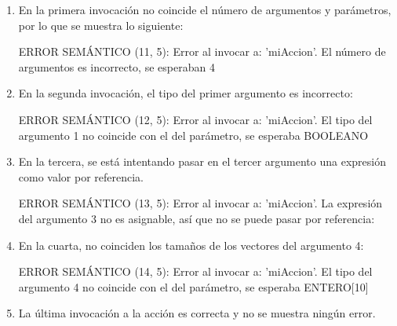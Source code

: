 \begin{enumerate}
    \item En la primera invocación no coincide el número de argumentos y parámetros, por lo que se muestra lo siguiente:

        \begin{codigo}
ERROR SEMÁNTICO (11, 5): Error al invocar a: 'miAccion'. El número de argumentos es incorrecto, se esperaban 4
        \end{codigo}

    \item En la segunda invocación, el tipo del primer argumento es incorrecto:

        \begin{codigo}
ERROR SEMÁNTICO (12, 5): Error al invocar a: 'miAccion'. El tipo del argumento 1 no coincide con el del parámetro, se esperaba BOOLEANO
        \end{codigo}

    \item En la tercera, se está intentando pasar en el tercer argumento una expresión como valor por referencia.

        \begin{codigo}
ERROR SEMÁNTICO (13, 5): Error al invocar a: 'miAccion'. La expresión del argumento 3 no es asignable, así que no se puede pasar por referencia:
        \end{codigo}

    \item En la cuarta, no coinciden los tamaños de los vectores del argumento 4:

        \begin{codigo}
ERROR SEMÁNTICO (14, 5): Error al invocar a: 'miAccion'. El tipo del argumento 4 no coincide con el del parámetro, se esperaba ENTERO[10]
        \end{codigo}

    \item La última invocación a la acción es correcta y no se muestra ningún error.
\end{enumerate}
